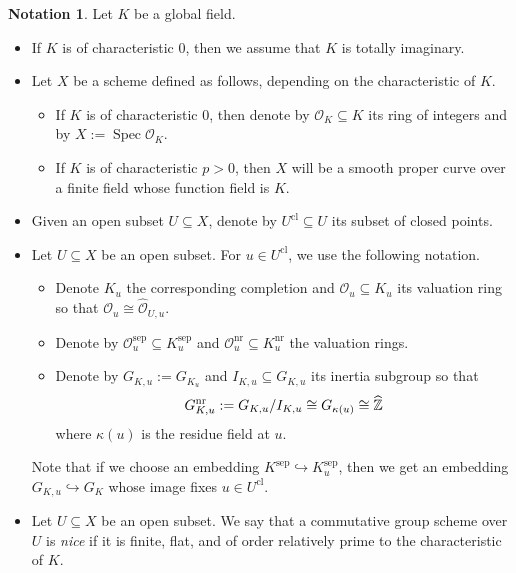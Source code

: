 \documentclass[a4paper]{amsart}
\theoremstyle{definition}
\newtheorem{notation}[thm]{Notation}
\DeclareMathOperator{\Spec}{Spec}
\numberwithin{equation}{section}
\begin{document}
\begin{notation}\label{notation-Globalfield} Let $K$ be a global field.
\begin{itemize}
    \item If $K$ is of characteristic $0$, then we assume that $K$ is totally imaginary.
    \item Let $X$ be a scheme defined as follows, depending on the characteristic of $K$.
    \begin{itemize}
        \item If $K$ is of characteristic $0$, then denote by $\mathcal{O}_K\subseteq K$ its ring of integers and by $X:=\Spec\mathcal{O}_K$.
        \item If $K$ is of characteristic $p>0$, then $X$ will be a smooth proper curve over a finite field whose function field is $K$.
    \end{itemize}
    \item Given an open subset $U\subseteq X$, denote by $U^\mathrm{cl}\subseteq U$ its subset of closed points.
    \item Let $U\subseteq X$ be an open subset. For $u\in U^\mathrm{cl}$, we use the following notation.
    \begin{itemize}
        \item Denote $K_u$ the corresponding completion and $\mathcal{O}_u\subseteq K_u$ its valuation ring so that $\mathcal{O}_u\cong\widehat{\mathcal{O}}_{U,u}$.
        \item Denote by $\mathcal{O}_u^\mathrm{sep}\subseteq K_u^\mathrm{sep}$ and $\mathcal{O}_u^\mathrm{nr}\subseteq K_u^\mathrm{nr}$ the valuation rings.
        \item Denote by $G_{K,u}:=G_{K_u}$ and $I_{K,u}\subseteq G_{K,u}$ its inertia subgroup so that
        \begin{align*}
            G_{K,u}^\mathrm{nr}:=G_{K,u}/I_{K,u}\cong G_{\kappa(u)}\cong\widehat{\mathbb{Z}}\rlap{\ }
        \end{align*}
        where $\kappa(u)$ is the residue field at $u$.
    \end{itemize}
    Note that if we choose an embedding $K^\mathrm{sep}\hookrightarrow K_u^\mathrm{sep}$, then we get an embedding $G_{K,u}\hookrightarrow G_K$ whose image fixes $u\in U^\mathrm{cl}$.
    \item Let $U\subseteq X$ be an open subset. We say that a commutative group scheme over $U$ is \emph{nice} if it is finite, flat, and of order relatively prime to the characteristic of $K$.
\end{itemize}
\end{notation}
\end{document}
